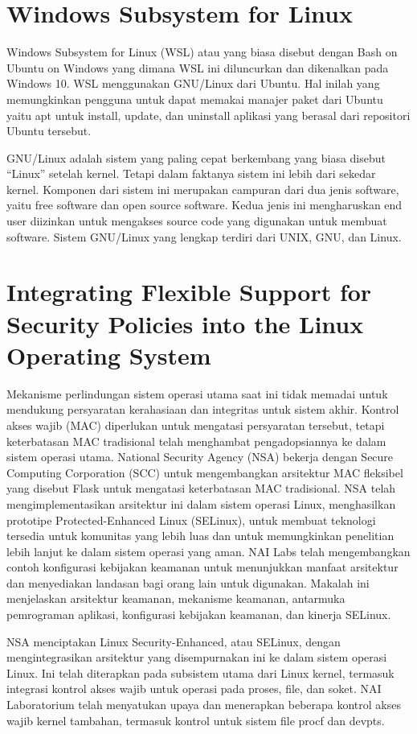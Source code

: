 \section{Windows Subsystem for Linux}
Windows Subsystem for Linux (WSL) atau yang biasa disebut dengan Bash on Ubuntu on Windows yang dimana WSL ini diluncurkan dan dikenalkan pada Windows 10. WSL menggunakan GNU/Linux dari Ubuntu. Hal inilah yang memungkinkan pengguna untuk dapat memakai manajer paket dari Ubuntu yaitu apt untuk install, update, dan uninstall aplikasi yang berasal dari repositori Ubuntu tersebut.

GNU/Linux adalah sistem yang paling cepat berkembang yang biasa disebut “Linux” setelah kernel. Tetapi dalam faktanya sistem ini lebih dari sekedar kernel. Komponen dari sistem ini merupakan campuran dari dua jenis software, yaitu free software dan open source software. Kedua jenis ini mengharuskan end user diizinkan untuk mengakses source code yang digunakan untuk membuat software. Sistem GNU/Linux yang lengkap terdiri dari UNIX, GNU, dan Linux.

\section{Integrating Flexible Support for Security Policies into the Linux Operating System}
Mekanisme perlindungan sistem operasi utama saat ini tidak memadai untuk mendukung persyaratan kerahasiaan dan integritas untuk sistem akhir. Kontrol akses wajib (MAC) diperlukan untuk mengatasi persyaratan tersebut, tetapi keterbatasan MAC tradisional telah menghambat pengadopsiannya ke dalam sistem operasi utama. National Security Agency (NSA) bekerja dengan Secure Computing Corporation (SCC) untuk mengembangkan arsitektur MAC fleksibel yang disebut Flask untuk mengatasi keterbatasan MAC tradisional. NSA telah mengimplementasikan arsitektur ini dalam sistem operasi Linux, menghasilkan prototipe Protected-Enhanced Linux (SELinux), untuk membuat teknologi tersedia untuk komunitas yang lebih luas dan untuk memungkinkan penelitian lebih lanjut ke dalam sistem operasi yang aman. NAI Labs telah mengembangkan contoh konfigurasi kebijakan keamanan untuk menunjukkan manfaat arsitektur dan menyediakan landasan bagi orang lain untuk digunakan. Makalah ini menjelaskan arsitektur keamanan, mekanisme keamanan, antarmuka pemrograman aplikasi, konfigurasi kebijakan keamanan, dan kinerja SELinux.

NSA menciptakan Linux Security-Enhanced, atau SELinux, dengan mengintegrasikan arsitektur yang disempurnakan ini ke dalam sistem operasi Linux. Ini telah diterapkan pada subsistem utama dari Linux kernel, termasuk integrasi kontrol akses wajib untuk operasi pada proses, file, dan soket. NAI Laboratorium telah menyatukan upaya dan menerapkan beberapa kontrol akses wajib kernel tambahan, termasuk kontrol untuk sistem file procf dan devpts.

